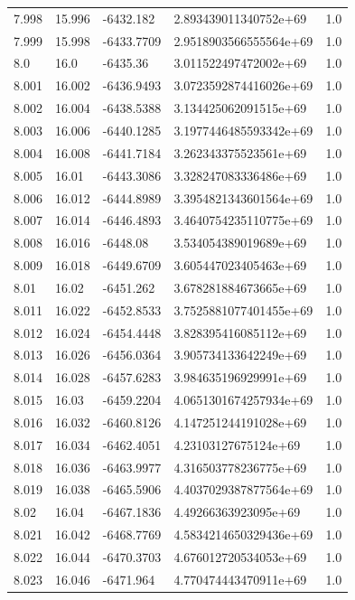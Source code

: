 \begin{tabular}{lllll}
7.998 & 15.996 & -6432.182 & 2.893439011340752e+69 & 1.0 \\
7.999 & 15.998 & -6433.7709 & 2.9518903566555564e+69 & 1.0 \\
8.0 & 16.0 & -6435.36 & 3.011522497472002e+69 & 1.0 \\
8.001 & 16.002 & -6436.9493 & 3.0723592874416026e+69 & 1.0 \\
8.002 & 16.004 & -6438.5388 & 3.134425062091515e+69 & 1.0 \\
8.003 & 16.006 & -6440.1285 & 3.1977446485593342e+69 & 1.0 \\
8.004 & 16.008 & -6441.7184 & 3.262343375523561e+69 & 1.0 \\
8.005 & 16.01 & -6443.3086 & 3.328247083336486e+69 & 1.0 \\
8.006 & 16.012 & -6444.8989 & 3.3954821343601564e+69 & 1.0 \\
8.007 & 16.014 & -6446.4893 & 3.4640754235110775e+69 & 1.0 \\
8.008 & 16.016 & -6448.08 & 3.534054389019689e+69 & 1.0 \\
8.009 & 16.018 & -6449.6709 & 3.605447023405463e+69 & 1.0 \\
8.01 & 16.02 & -6451.262 & 3.678281884673665e+69 & 1.0 \\
8.011 & 16.022 & -6452.8533 & 3.7525881077401455e+69 & 1.0 \\
8.012 & 16.024 & -6454.4448 & 3.828395416085112e+69 & 1.0 \\
8.013 & 16.026 & -6456.0364 & 3.905734133642249e+69 & 1.0 \\
8.014 & 16.028 & -6457.6283 & 3.984635196929991e+69 & 1.0 \\
8.015 & 16.03 & -6459.2204 & 4.0651301674257934e+69 & 1.0 \\
8.016 & 16.032 & -6460.8126 & 4.147251244191028e+69 & 1.0 \\
8.017 & 16.034 & -6462.4051 & 4.23103127675124e+69 & 1.0 \\
8.018 & 16.036 & -6463.9977 & 4.316503778236775e+69 & 1.0 \\
8.019 & 16.038 & -6465.5906 & 4.4037029387877564e+69 & 1.0 \\
8.02 & 16.04 & -6467.1836 & 4.49266363923095e+69 & 1.0 \\
8.021 & 16.042 & -6468.7769 & 4.5834214650329436e+69 & 1.0 \\
8.022 & 16.044 & -6470.3703 & 4.676012720534053e+69 & 1.0 \\
8.023 & 16.046 & -6471.964 & 4.770474443470911e+69 & 1.0 \\

\end{tabular}
